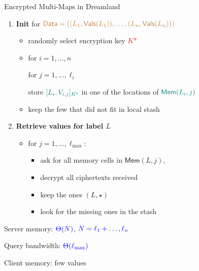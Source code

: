 \documentclass[]{beamer}
\newcommand{\db}{\mathsf{Data}}
\newcommand{\mem}{\mathsf{Mem}}
\newcommand{\vals}{\mathsf{Vals}}
\newcommand{\ke}{K^{\mathsf{e}}}
\newcommand{\LMax}{\ell_{\text{max}}}
\begin{document}
{\begin{frame}

\begin{block}{Encrypted Multi-Maps in Dreamland}
\begin{enumerate}[<+->]
    \item {\color{red} \bf Init}
       for  $\color{brown}{\db=((L_1,\vals(L_1)),\ldots,(L_n,\vals(L_n)))}$
    
    \begin{itemize}[<+->]
        \item randomly select encryption key $\color{red} \ke$
        \item for $i=1,\ldots,n$

            \quad for $j=1,\ldots,\ell_i$

            \qquad store $\color{teal}[L_i,V_{i,j}]_{\ke}$ 
                in one of the locations of $\color{teal} \mem(L_i,j)$

        \item keep the {\color{blue} few} that did not fit in local stash
    \end{itemize}

    \item {\color{red} \bf Retrieve values for label $L$}

    \begin{itemize}[<+->]
        \item for $j=1,\ldots,\LMax$:
            
            \begin{itemize}
                \item ask for all memory cells in $\mem(L,j)$, 
                \item decrypt all ciphertexts received
                \item keep the ones $(L,\star)$
                \item look for the missing ones in the stash
            \end{itemize}
    \end{itemize}
\end{enumerate}

\end{block}

\pause
{\color{magenta} Server memory:} $\color{blue} \Theta(N)$, $\color{blue} N=\ell_1+\ldots,\ell_n$

\pause
{\color{magenta} Query bandwidth:} $\color{blue} \Theta(\LMax)$

\pause
{\color{magenta} Client memory:} {\color{blue} few} values
\end{frame}

}
\end{document}
